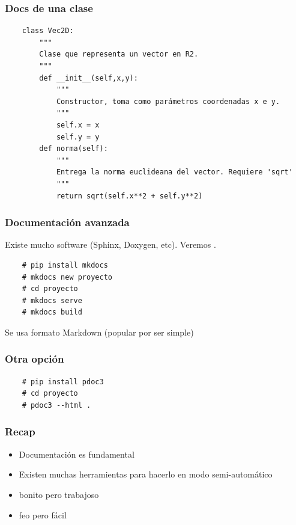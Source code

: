 \documentclass[14pt,aspectratio=169,xcolor=dvipsnames]{beamer}
\begin{document}
\begin{frame}[fragile]\frametitle{Docs de una clase}
    \begin{footnotesize}
    \begin{verbatim}
    class Vec2D:
        """
        Clase que representa un vector en R2.
        """
        def __init__(self,x,y):
            """
            Constructor, toma como parámetros coordenadas x e y.
            """
            self.x = x
            self.y = y
        def norma(self):
            """
            Entrega la norma euclideana del vector. Requiere 'sqrt'
            """
            return sqrt(self.x**2 + self.y**2)
    \end{verbatim}

    \vspace{-1cm}
    \hfill    {}
    \end{footnotesize}
\end{frame}
\begin{frame}[fragile]\frametitle{Documentación avanzada}
    Existe mucho software (Sphinx, Doxygen, etc). Veremos .

    \begin{verbatim}
    # pip install mkdocs
    # mkdocs new proyecto
    # cd proyecto
    # mkdocs serve
    # mkdocs build
    \end{verbatim} 

    \vspace{1cm}
    Se usa formato Markdown (popular por ser simple)

\end{frame}
\begin{frame}[fragile]\frametitle{Otra opción}
    \begin{verbatim}
    # pip install pdoc3
    # cd proyecto
    # pdoc3 --html .
    \end{verbatim}

\end{frame}
\begin{frame}\frametitle{Recap}
    \begin{itemize}
        \item Documentación es fundamental
        \item Existen muchas herramientas para hacerlo en modo semi-automático
        \item {} bonito pero trabajoso
        \item {} feo pero fácil
    \end{itemize}
\end{frame}
\end{document}
